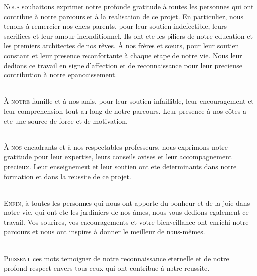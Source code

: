 \documentclass[a4paper, 11pt, openany]{report}
\begin{document}
\Newpage



\lettrine[nindent=0em, slope=-.5em]{\color{Eblue}N}{ous} souhaitons exprimer notre profonde gratitude à toutes les personnes qui ont contribue à notre parcours et à la realisation de ce projet. En particulier, nous tenons à remercier nos chers parents, pour leur soutien indefectible, leurs sacrifices et leur amour inconditionnel. Ils ont ete les piliers de notre education et les premiers architectes de nos rêves. À nos frères et sœurs, pour leur soutien constant et leur presence reconfortante à chaque etape de notre vie. Nous leur dedions ce travail en signe d'affection et de reconnaissance pour leur precieuse contribution à notre epanouissement.

\ \\
\lettrine[nindent=0em, slope=-.5em]{\color{Eblue}À}{ notre} famille et à nos amis, pour leur soutien infaillible, leur encouragement et leur comprehension tout au long de notre parcours. Leur presence à nos côtes a ete une source de force et de motivation.

\ \\
\lettrine[nindent=0em, slope=-.5em]{\color{Eblue}À}{ nos} encadrants et à nos respectables professeurs, nous exprimons notre gratitude pour leur expertise, leurs conseils avises et leur accompagnement precieux. Leur enseignement et leur soutien ont ete determinants dans notre formation et dans la reussite de ce projet.

\ \\
\lettrine[nindent=0em, slope=-.5em]{\color{Eblue}E}{nfin}, à toutes les personnes qui nous ont apporte du bonheur et de la joie dans notre vie, qui ont ete les jardiniers de nos âmes, nous vous dedions egalement ce travail. Vos sourires, vos encouragements et votre bienveillance ont enrichi notre parcours et nous ont inspires à donner le meilleur de nous-mêmes.

\ \\
\lettrine[nindent=0em, slope=-.5em]{\color{Eblue}P}{uissent} ces mots temoigner de notre reconnaissance eternelle et de notre profond respect envers tous ceux qui ont contribue à notre reussite.
\end{document}
